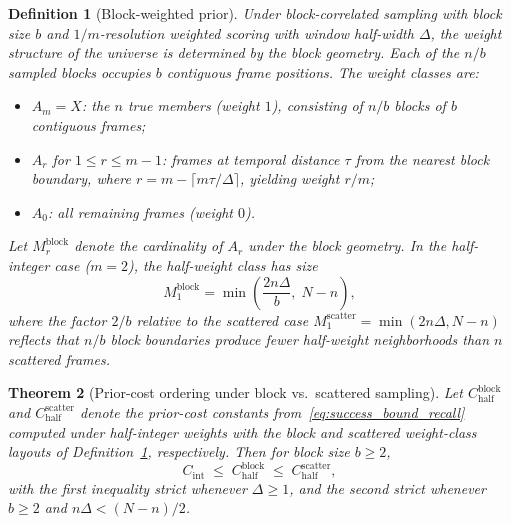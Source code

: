 \documentclass[letterpaper]{article} %
\newtheorem{theorem}{Theorem}
\newtheorem{definition}[theorem]{Definition}
\begin{document}
\begin{definition}[Block-weighted prior]
\label{def:block_weighted_prior}
Under block-correlated sampling with block size $b$ and
$1/m$-resolution weighted scoring with window half-width $\Delta$,
the weight structure of the universe is determined by the
block geometry.  Each of the $n/b$ sampled blocks occupies $b$
contiguous frame positions.  The weight classes are:
\begin{itemize}[leftmargin=*]
\item $A_m = X$: the $n$ true members (weight $1$), consisting of
  $n/b$ blocks of $b$ contiguous frames;
\item $A_r$ for $1 \le r \le m-1$: frames at temporal distance
  $\tau$ from the nearest block boundary, where
  $r = m - \lceil m\tau/\Delta \rceil$, yielding weight $r/m$;
\item $A_0$: all remaining frames (weight $0$).
\end{itemize}
Let $M_r^{\mathrm{block}}$ denote the cardinality of $A_r$ under
the block geometry.  In the half-integer case ($m=2$), the half-weight
class has size
\begin{equation}
\label{eq:m_block_half}
M_1^{\mathrm{block}}
= \min\!\left(\frac{2n\Delta}{b},\; N - n\right),
\end{equation}
where the factor $2/b$ relative to the scattered case
$M_1^{\mathrm{scatter}} = \min(2n\Delta, N-n)$ reflects that
$n/b$ block boundaries produce fewer half-weight neighborhoods
than $n$ scattered frames.
\end{definition}

\begin{theorem}[Prior-cost ordering under block vs.\ scattered sampling]
\label{thm:prior_block}
Let $C^{\mathrm{block}}_{\mathrm{half}}$ and
$C^{\mathrm{scatter}}_{\mathrm{half}}$ denote the prior-cost
constants from~\eqref{eq:success_bound_recall} computed under
half-integer weights with the block and scattered weight-class
layouts of Definition~\ref{def:block_weighted_prior}, respectively.
Then for block size $b \ge 2$,
\begin{equation}
\label{eq:prior_block_ordering}
C_{\mathrm{int}}
\;\le\;
C^{\mathrm{block}}_{\mathrm{half}}
\;\le\;
C^{\mathrm{scatter}}_{\mathrm{half}},
\end{equation}
with the first inequality strict whenever $\Delta \ge 1$, and
the second strict whenever $b \ge 2$ and $n\Delta < (N-n)/2$.
\end{theorem}
\end{document}
